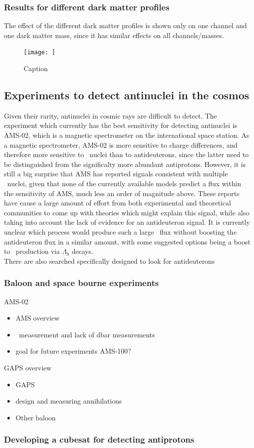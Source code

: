 \subsubsection{Results for different dark matter profiles}\label{sec:ResDMProfiles}
The effect of the different dark matter profiles is shown only on one channel and one dark matter mass, since it has similar effects on all channels/masses. 

\begin{figure}
    \centering
    \texttt{[image: ]}
    \caption{Caption}
    \label{fig:my_label}
\end{figure}
\subsection{Experiments to detect antinuclei in the cosmos}
Given their rarity, antinuclei in cosmic rays are difficult to detect. The experiment which currently has the best sensitivity for detecting antinuclei is AMS-02, which is a magnetic spectrometer on the international space station. As a magnetic spectrometer, AMS-02 is more sensitive to charge differences, and therefore more sensitive to \ahe\ nuclei than to antideuterons, since the latter need to be distinguished from the significalty more abundant antiprotons. However, it is still a big surprise that AMS has reported signals consistent with multiple \ahe\ nuclei, given that none of the currently available models predict a flux within the sensitivity of AMS, much less an order of magnitude above. These reports have cause a large amount of effort from both experimental and theoretical communities to come up with theories which might explain this signal, while also taking into account the lack of evidence for an antideuteron signal. It is currently unclear which process would produce such a large \ahe\ flux without boosting the antideuteron flux in a similar amount, with some suggested options being a boost to \ahe\ production via $\Lambda_b$ decays\cite{}. \\

There are also searched specifically designed to look for antideuterons
\subsubsection{Baloon and space bourne experiments}
AMS-02
\begin{itemize}
    \item AMS overview
    \item \ahe\ measurement and lack of dbar measurements
    \item goal for future experiments AMS-100?
\end{itemize}
GAPS overview
\begin{itemize}
    \item GAPS
    \item design and measuring annihilations
    \item Other baloon 
\end{itemize}
\subsubsection{Developing a cubesat for detecting antiprotons}

